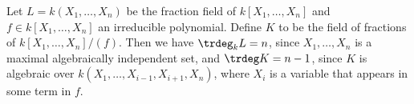 Let $L = k(X_1, \ldots, X_n)$ be the fraction field of $k[X_1, \ldots, X_n]$ and
$f \in k[X_1, \ldots, X_n]$ an irreducible polynomial. Define $K$ to be
the field of fractions of $k[X_1, \ldots, X_n]/(f)$. Then we have
$\trdeg_k L = n$, since $X_1, \ldots, X_n$ is a maximal algebraically independent
set, and $\trdeg K = n-1$, since $K$ is algebraic over $k(X_1, \ldots, X_{i-1}, X_{i+1}, X_n)$,
where $X_i$ is a variable that appears in some term in $f$.
